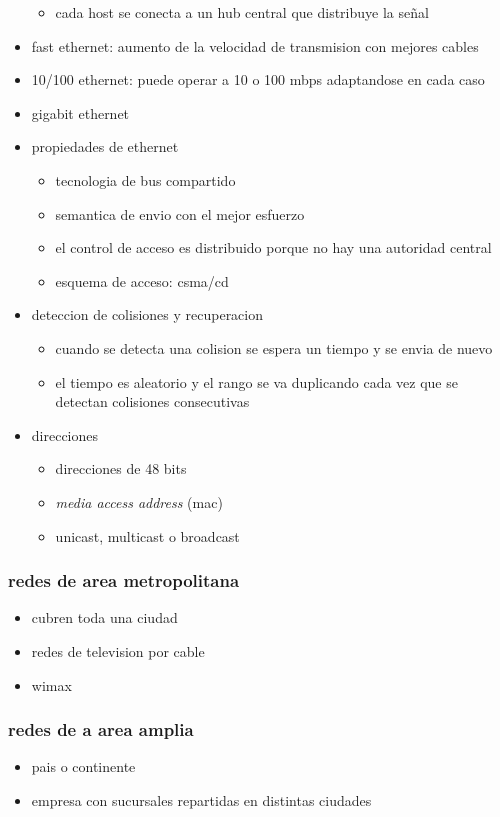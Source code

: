 \documentclass[11pt]{article}
\begin{document}
\begin{itemize}
\begin{itemize}
\item cada host se conecta a un hub central que distribuye la señal
\end{itemize}
\item fast ethernet: aumento de la velocidad de transmision con mejores cables
\item 10/100 ethernet: puede operar a 10 o 100 mbps adaptandose en cada caso
\item gigabit ethernet
\item propiedades de ethernet
\begin{itemize}
\item tecnologia de bus compartido
\item semantica de envio con el mejor esfuerzo
\item el control de acceso es distribuido porque no hay una autoridad central
\item esquema de acceso: csma/cd
\end{itemize}
\item deteccion de colisiones y recuperacion
\begin{itemize}
\item cuando se detecta una colision se espera un tiempo y se envia de nuevo
\item el tiempo es aleatorio y el rango se va duplicando cada vez que se detectan colisiones consecutivas
\end{itemize}
\item direcciones
\begin{itemize}
\item direcciones de 48 bits
\item \emph{media access address} (mac)
\item unicast, multicast o broadcast
\end{itemize}
\end{itemize}
\subsubsection{redes de area metropolitana}
\label{sec:org61e5f7f}
\begin{itemize}
\item cubren toda una ciudad
\item redes de television por cable
\item wimax
\end{itemize}
\subsubsection{redes de a area amplia}
\label{sec:org28a8c16}
\begin{itemize}
\item pais o continente
\item empresa con sucursales repartidas en distintas ciudades
\end{itemize}
\end{document}
